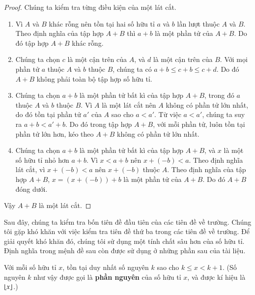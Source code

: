 \begin{proof}
    Chúng ta kiểm tra từng điều kiện của một lát cắt.
    \begin{enumerate}[label={(DC\arabic*)}]
        \item Vì $A$ và $B$ khác rỗng nên tồn tại hai số hữu tỉ $a$ và $b$ lần lượt thuộc $A$ và $B$. Theo định nghĩa của tập hợp $A + B$ thì $a + b$ là một phần tử của $A + B$. Do đó tập hợp $A + B$ khác rỗng.
        \item Chúng ta chọn $c$ là một cận trên của $A$, và $d$ là một cận trên của $B$. Với mọi phần tử $a$ thuộc $A$ và $b$ thuộc $B$, chúng ta có $a + b\leq c + b \leq c + d$. Do đó $A + B$ không phải toàn bộ tập hợp số hữu tỉ.
        \item Chúng ta chọn $a + b$ là một phần tử bất kì của tập hợp $A + B$, trong đó $a$ thuộc $A$ và $b$ thuộc $B$. Vì $A$ là một lát cắt nên $A$ không có phần tử lớn nhất, do đó tồn tại phần tử $a'$ của $A$ sao cho $a < a'$. Từ việc $a < a'$, chúng ta suy ra $a + b < a' + b$. Do đó trong tập hợp $A + B$, với mỗi phần tử, luôn tồn tại phần tử lớn hơn, kéo theo $A + B$ không có phần tử lớn nhất.
        \item Chúng ta chọn $a + b$ là một phần tử bất kì của tập hợp $A + B$, và $x$ là một số hữu tỉ nhỏ hơn $a + b$. Vì $x < a + b$ nên $x + (-b) < a$. Theo định nghĩa lát cắt, vì $x + (-b) < a$ nên $x + (-b)$ thuộc $A$. Theo định nghĩa của tập hợp $A + B$, $x = (x + (-b)) + b$ là một phần tử của $A + B$. Do đó $A + B$ đóng dưới.
    \end{enumerate}

    Vậy $A + B$ là một lát cắt.
\end{proof}

Sau đây, chúng ta kiểm tra bốn tiên đề đầu tiên của các tiên đề về trường. Chúng tôi gặp khó khăn với việc kiểm tra tiên đề thứ ba trong các tiên đề về trường. Để giải quyết khó khăn đó, chúng tôi sử dụng một tính chất sâu hơn của số hữu tỉ. Định nghĩa trong mệnh đề sau còn được sử dụng ở những phần sau của tài liệu.

\begin{proposition}\label{proposition:integral-part-of-rational-numbers}
    Với mỗi số hữu tỉ $x$, tồn tại duy nhất số nguyên $k$ sao cho $k\leq x < k+1$. (Số nguyên $k$ như vậy được gọi là \textbf{phần nguyên} của số hữu tỉ $x$, và được kí hiệu là $\left\lfloor{x}\right\rfloor$.)
\end{proposition}

